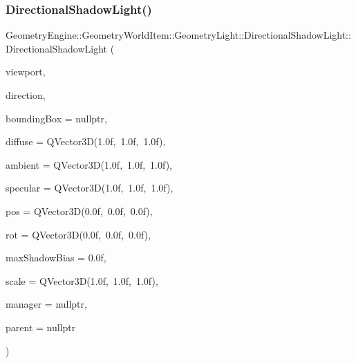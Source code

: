 \subsubsection{\texorpdfstring{DirectionalShadowLight()}{DirectionalShadowLight()}\hspace{0.1cm}{\footnotesize\ttfamily [1/2]}}
{\footnotesize\ttfamily Geometry\+Engine\+::\+Geometry\+World\+Item\+::\+Geometry\+Light\+::\+Directional\+Shadow\+Light\+::\+Directional\+Shadow\+Light (\begin{DoxyParamCaption}\item[{const \mbox{\hyperlink{class_geometry_engine_1_1_geometry_item_utils_1_1_viewport}{Geometry\+Item\+Utils\+::\+Viewport}} \&}]{viewport,  }\item[{const Q\+Vector3D \&}]{direction,  }\item[{\mbox{\hyperlink{class_geometry_engine_1_1_geometry_world_item_1_1_geometry_item_1_1_geometry_item}{Geometry\+Item\+::\+Geometry\+Item}} $\ast$}]{bounding\+Box = {\ttfamily nullptr},  }\item[{const Q\+Vector3D \&}]{diffuse = {\ttfamily QVector3D(1.0f,~1.0f,~1.0f)},  }\item[{const Q\+Vector3D \&}]{ambient = {\ttfamily QVector3D(1.0f,~1.0f,~1.0f)},  }\item[{const Q\+Vector3D \&}]{specular = {\ttfamily QVector3D(1.0f,~1.0f,~1.0f)},  }\item[{const Q\+Vector3D \&}]{pos = {\ttfamily QVector3D(0.0f,~0.0f,~0.0f)},  }\item[{const Q\+Vector3D \&}]{rot = {\ttfamily QVector3D(0.0f,~0.0f,~0.0f)},  }\item[{float}]{max\+Shadow\+Bias = {\ttfamily 0.0f},  }\item[{const Q\+Vector3D \&}]{scale = {\ttfamily QVector3D(1.0f,~1.0f,~1.0f)},  }\item[{const \mbox{\hyperlink{class_geometry_engine_1_1_light_utils_1_1_light_component_manager}{Light\+Utils\+::\+Light\+Component\+Manager}} $\ast$const}]{manager = {\ttfamily nullptr},  }\item[{\mbox{\hyperlink{class_geometry_engine_1_1_geometry_world_item_1_1_world_item}{World\+Item}} $\ast$}]{parent = {\ttfamily nullptr} }\end{DoxyParamCaption})}

